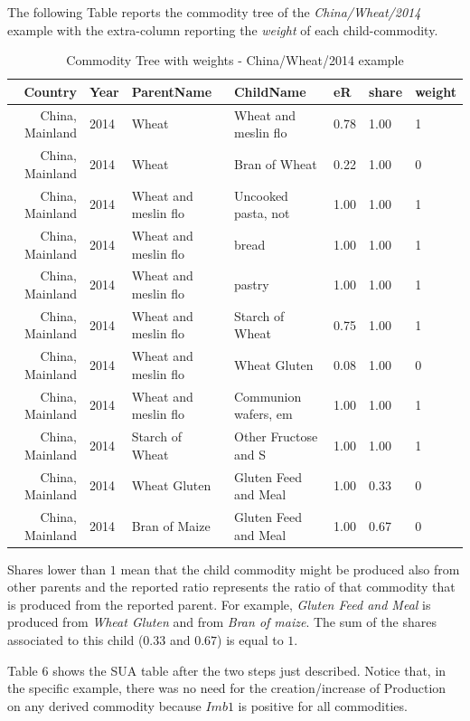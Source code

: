 \documentclass[]{article}
\begin{document}
The following Table reports the commodity tree of the
\emph{China/Wheat/2014} example with the extra-column reporting the
\emph{weight} of each child-commodity.

\begin{table}

\caption{\label{tab:t4}Commodity Tree  with weights - China/Wheat/2014 example}
\centering
\begin{tabular}[t]{r|l|l|l|l|l|l}
\hline
Country & Year & ParentName & ChildName & eR & share & weight\\
\hline
China, Mainland & 2014 & Wheat & Wheat and meslin flo & 0.78 & 1.00 & 1\\
\hline
China, Mainland & 2014 & Wheat & Bran of Wheat & 0.22 & 1.00 & 0\\
\hline
China, Mainland & 2014 & Wheat and meslin flo & Uncooked pasta, not & 1.00 & 1.00 & 1\\
\hline
China, Mainland & 2014 & Wheat and meslin flo & bread & 1.00 & 1.00 & 1\\
\hline
China, Mainland & 2014 & Wheat and meslin flo & pastry & 1.00 & 1.00 & 1\\
\hline
China, Mainland & 2014 & Wheat and meslin flo & Starch of Wheat & 0.75 & 1.00 & 1\\
\hline
China, Mainland & 2014 & Wheat and meslin flo & Wheat Gluten & 0.08 & 1.00 & 0\\
\hline
China, Mainland & 2014 & Wheat and meslin flo & Communion wafers, em & 1.00 & 1.00 & 1\\
\hline
China, Mainland & 2014 & Starch of Wheat & Other Fructose and S & 1.00 & 1.00 & 1\\
\hline
China, Mainland & 2014 & Wheat Gluten & Gluten Feed and Meal & 1.00 & 0.33 & 0\\
\hline
China, Mainland & 2014 & Bran of Maize & Gluten Feed and Meal & 1.00 & 0.67 & 0\\
\hline
\end{tabular}
\end{table}

Shares lower than \(1\) mean that the child commodity might be produced
also from other parents and the reported ratio represents the ratio of
that commodity that is produced from the reported parent. For example,
\emph{Gluten Feed and Meal} is produced from \emph{Wheat Gluten} and
from \emph{Bran of maize}. The sum of the shares associated to this
child (\(0.33\) and \(0.67\)) is equal to \(1\).

Table 6 shows the SUA table after the two steps just described. Notice
that, in the specific example, there was no need for the
creation/increase of Production on any derived commodity because
\(Imb1\) is positive for all commodities.
\end{document}
